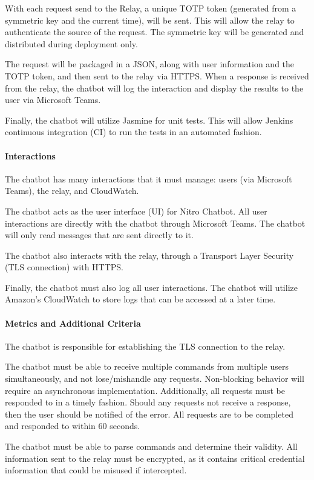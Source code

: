 With each request send to the Relay, a unique TOTP token (generated from a symmetric key and the current time), will be sent.
This will allow the relay to authenticate the source of the request. The symmetric key will be generated and distributed during deployment only.

The request will be packaged in a JSON, along with user information and the TOTP token, and then sent to the relay via HTTPS.
When a response is received from the relay, the chatbot will log the interaction and display the results to the user via Microsoft Teams.

Finally, the chatbot will utilize Jasmine for unit tests. This will allow Jenkins continuous integration (CI) to run the tests in an automated fashion.

\paragraph{Interactions}
The chatbot has many interactions that it must manage: users (via Microsoft Teams), the relay, and CloudWatch.

The chatbot acts as the user interface (UI) for Nitro Chatbot.
All user interactions are directly with the chatbot through Microsoft Teams.
The chatbot will only read messages that are sent directly to it.

The chatbot also interacts with the relay, through a Transport Layer Security (TLS connection) with HTTPS.

Finally, the chatbot must also log all user interactions.
The chatbot will utilize Amazon's CloudWatch to store logs that can be accessed at a later time.

\paragraph{Metrics and Additional Criteria}
The chatbot is responsible for establishing the TLS connection to the relay.

The chatbot must be able to receive multiple commands from multiple users simultaneously, and not lose/mishandle any requests.
Non-blocking behavior will require an asynchronous implementation.
Additionally, all requests must be responded to in a timely fashion.
Should any requests not receive a response, then the user should be notified of the error.
All requests are to be completed and responded to within 60 seconds.

The chatbot must be able to parse commands and determine their validity.
All information sent to the relay must be encrypted, as it contains critical credential information that could be misused if intercepted.

